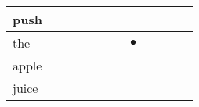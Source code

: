 \documentclass[landscape]{article}
\newcommand{\ssp}{\hspace{2pt}}
\newcommand{\mex}{\cellcolor{g}$\bullet$}
\begin{document}
\begin{tabular}{|l|p{10pt}|p{10pt}|p{10pt}|p{10pt}|p{10pt}|p{10pt}|p{10pt}|p{10pt}|p{10pt}|p{10pt}|p{10pt}|}
\hline
\ssp push \ssp&\hspace{2pt}&\hspace{2pt}&\hspace{2pt}&\hspace{2pt}&\hspace{2pt}&\hspace{2pt}&\hspace{2pt}&\hspace{2pt}&\hspace{2pt}&\hspace{2pt}&\hspace{2pt}\\
\hline
\ssp \cellcolor{ref6}the \ssp&\hspace{2pt}&\hspace{2pt}&\hspace{2pt}&\hspace{2pt}&\hspace{2pt}&\hspace{2pt}&\hspace{2pt}\mex&\hspace{2pt}&\hspace{2pt}&\hspace{2pt}&\hspace{2pt}\\
\hline
\ssp apple \ssp&\hspace{2pt}&\hspace{2pt}&\hspace{2pt}&\hspace{2pt}&\hspace{2pt}&\hspace{2pt}&\hspace{2pt}&\hspace{2pt}&\hspace{2pt}&\hspace{2pt}&\hspace{2pt}\\
\hline
\ssp juice \ssp&\hspace{2pt}&\hspace{2pt}&\hspace{2pt}&\hspace{2pt}&\hspace{2pt}&\hspace{2pt}&\hspace{2pt}&\hspace{2pt}&\hspace{2pt}&\hspace{2pt}&\hspace{2pt}\\

\end{tabular}
\end{document}

